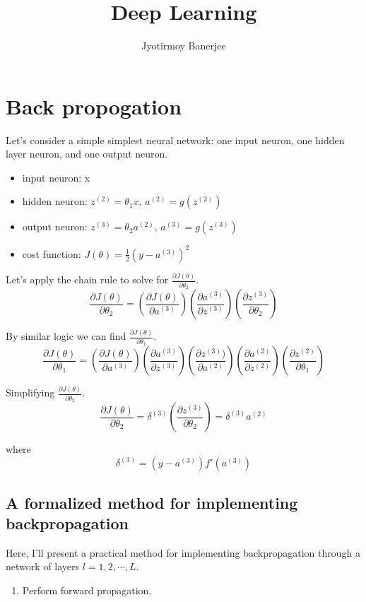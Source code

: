 \documentclass{article}
\title{Deep Learning}
\author{Jyotirmoy Banerjee}
\begin{document}
\maketitle


\section{Back propogation}

Let's consider a simple simplest neural network: one input neuron, one hidden layer neuron, and one output neuron.
\begin{itemize}
\item input neuron: x 
\item hidden neuron: $z^{(2)} = \theta_1 x, \, a^{(2)} = g(z^{(2)})$
\item output neuron:  $z^{(3)} = \theta_2 a^{(2)},  \, a^{(3)} = g(z^{(3)})$
\item cost function: $J(\theta) = \frac{1}{2} (y - a^{(3)})^2$
\end{itemize}


Let's apply the chain rule to solve for $\frac{\partial J(\theta)}{\partial \theta_2}$.
\[
\frac{\partial J(\theta)}{\partial \theta_2}
=  \left( \frac{\partial J(\theta)}{\partial a^{(3)}} \right) \left(  \frac{\partial a^{(3)}}{\partial z^{(3)}} \right) \left(  \frac{\partial z^{(3)}}{\partial \theta_2} \right) 
\]

By similar logic we can find $\frac{\partial J(\theta)}{\partial \theta_1}$.
\[
\frac{\partial J(\theta)}{\partial \theta_1}
 =  \left( \frac{\partial J(\theta)}{\partial a^{(3)}} \right) \left(  \frac{\partial a^{(3)}}{\partial z^{(3)}} \right) \left( \frac{\partial z^{(3)})}{\partial a^{(2)}} \right) \left(  \frac{\partial a^{(2)}}{\partial z^{(2)}} \right) \left(  \frac{\partial z^{(2)}}{\partial \theta_1} \right) 
\]

 
Simplifying $\frac{\partial J(\theta)}{\partial \theta_2}$.
\[
\frac{\partial J(\theta)}{\partial \theta_2}
=  \delta^{(3)}  \left(  \frac{\partial z^{(3)}}{\partial \theta_2} \right)
=  \delta^{(3)} a^{(2)}
\]

where \[ \delta^{(3)} = (y - a^{(3)}) f'(a^{(3)})\]

\subsection{A formalized method for implementing backpropagation}
Here, I'll present a practical method for implementing backpropagation through a network of layers $l=1,2,\cdots,L$.
\begin{enumerate}
\item Perform forward propagation.
\end{enumerate}
\end{document}
